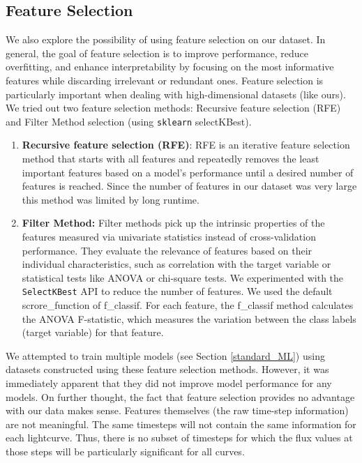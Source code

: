 \documentclass{article}
\begin{document}
\subsection{Feature Selection}
We also explore the possibility of using feature selection on our dataset. In general, the goal of feature selection is to improve performance, reduce overfitting, and enhance interpretability by focusing on the most informative features while discarding irrelevant or redundant ones. Feature selection is particularly important when dealing with high-dimensional datasets (like ours). We tried out two feature selection methods: Recursive feature selection (RFE) and Filter Method selection (using \texttt{sklearn} selectKBest).

\begin{enumerate}
    \item \textbf{Recursive feature selection (RFE)}: RFE is an iterative feature selection method that starts with all features and repeatedly removes the least important features based on a model's performance until a desired number of features is reached. Since the number of features in our dataset was very large this method was limited by long runtime. 
    \item \textbf{Filter Method:} Filter methods pick up the intrinsic properties of the features measured via univariate statistics instead of cross-validation performance. They evaluate the relevance of features based on their individual characteristics, such as correlation with the target variable or statistical tests like ANOVA or chi-square tests. We experimented with the \texttt{SelectKBest} API to reduce the number of features. We used the default scrore\_function of f\_classif. For each feature, the f\_classif method calculates the ANOVA F-statistic, which measures the variation between the class labels (target variable) for that feature. 
\end{enumerate} 

We attempted to train multiple models (see Section \ref{standard_ML}) using datasets constructed using these feature selection methods. However, it was immediately apparent that they did not improve model performance for any models. On further thought, the fact that feature selection provides no advantage with our data makes sense. Features themselves (the raw time-step information) are not meaningful. The same timesteps will not contain the same information for each lightcurve. Thus, there is no subset of timesteps for which the flux values at those steps will be particularly significant for all curves.  
\end{document}
